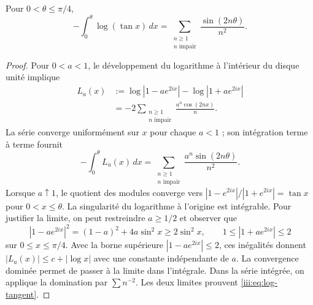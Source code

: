 \begin{lemma}
\label{iii:lem:log-tangent}
Pour $0<\theta\leq\pi/4$,
\begin{equation}
 -\int_0^\theta\log(\tan x)\,dx
 =\sum_{\substack{n\geq1\\n\text{ impair}}}
      \frac{\sin(2n\theta)}{n^2}.
 \label{iii:eq:log-tangent}
\end{equation}
\end{lemma}
\begin{proof}
Pour $0<a<1$, le développement du logarithme à l’intérieur du disque unité implique
\begin{align*}
 L_a(x)
 &:=\log|1-ae^{2ix}|-\log|1+ae^{2ix}|\\
 &=-2\sum_{\substack{n\geq1\\n\text{ impair}}}
       \frac{a^n\cos(2nx)}{n}.
\end{align*}
La série converge uniformément sur $x$ pour chaque $a<1$ ; son intégration
terme à terme fournit
\[
 -\int_0^\theta L_a(x)\,dx
 =\sum_{\substack{n\geq1\\n\text{ impair}}}
       \frac{a^n\sin(2n\theta)}{n^2}.
\]
Lorsque $a\uparrow1$, le quotient des modules converge vers
$|1-e^{2ix}|/|1+e^{2ix}|=\tan x$ pour $0<x\leq\theta$.
La singularité du logarithme à l’origine est intégrable. Pour justifier
la limite, on peut restreindre $a\geq1/2$ et observer que
\[
 |1-ae^{2ix}|^2=(1-a)^2+4a\sin^2x
 \geq2\sin^2x,
 \qquad 1\leq|1+ae^{2ix}|\leq2
\]
sur $0\leq x\leq\pi/4$. Avec la borne supérieure
$|1-ae^{2ix}|\leq2$, ces inégalités donnent
$|L_a(x)|\leq c+|\log x|$ avec une constante indépendante de $a$.
La convergence dominée permet de passer à la limite dans l’intégrale.
Dans la série intégrée, on applique la domination par $\sum n^{-2}$.
Les deux limites prouvent \eqref{iii:eq:log-tangent}.
\end{proof}

